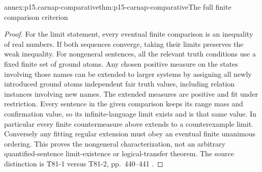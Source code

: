 \begin{annexitem}{annex:p15.carnap-comparative}{thm:p15-carnap-comparative}{The full finite comparison criterion}
\begin{proof}
For the limit statement, every eventual finite comparison is an
inequality of real numbers. If both sequences converge, taking their
limits preserves the weak inequality. For nongeneral sentences, all
the relevant truth conditions use a fixed finite set of ground atoms.
Any chosen positive measure on the states involving those names can
be extended to larger systems by assigning all newly introduced ground
atoms independent fair truth values, including relation instances
involving new names. The extended measures are positive and fit under
restriction. Every sentence in the given comparison keeps its range
mass and confirmation value, so its infinite-language limit exists and
is that same value. In particular every finite countermeasure above
extends to a counterexample limit. Conversely any fitting regular
extension must obey an eventual finite unanimous ordering. This proves
the nongeneral characterization, not an arbitrary quantified-sentence
limit-existence or logical-transfer theorem. The source distinction is
T81-1 versus T81-2, pp.~440--441 \cite{Carnap1950Probability}.
\end{proof}
\end{annexitem}

